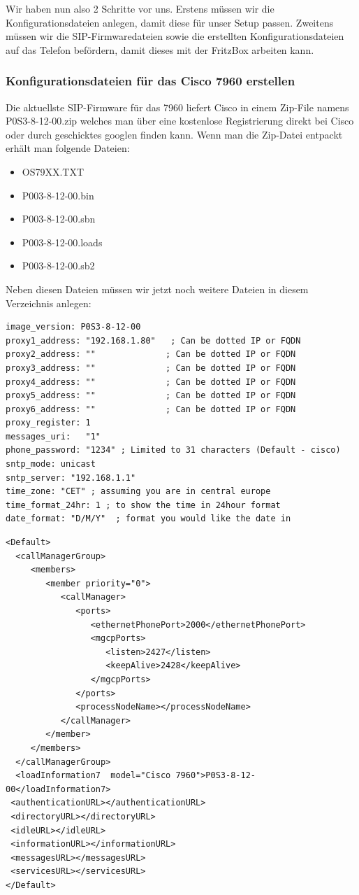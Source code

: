 \documentclass[a4paper,12pt]{scrbook}
\begin{document}
Wir haben nun also 2 Schritte vor uns. Erstens müssen wir die Konfigurationsdateien anlegen, damit diese für unser Setup passen. Zweitens müssen wir die SIP-Firmwaredateien sowie die erstellten Konfigurationsdateien 
auf das Telefon befördern, damit dieses mit der FritzBox arbeiten kann.

\subsubsection{Konfigurationsdateien für das Cisco 7960 erstellen}

Die aktuellste SIP-Firmware für das 7960 liefert Cisco in einem Zip-File namens P0S3-8-12-00.zip welches man über eine kostenlose Registrierung
direkt bei Cisco oder durch geschicktes googlen finden kann. Wenn man die Zip-Datei entpackt erhält man folgende Dateien:
\begin{itemize}
 \item OS79XX.TXT
 \item P003-8-12-00.bin
 \item P003-8-12-00.sbn
 \item P003-8-12-00.loads
 \item P003-8-12-00.sb2
\end{itemize}

Neben diesen Dateien müssen wir jetzt noch weitere Dateien in diesem Verzeichnis anlegen:

\begin{lstlisting}[caption={SIPDefault.cnf},label=lst:7960sipdefaultcnf]
image_version: P0S3-8-12-00
proxy1_address: "192.168.1.80"   ; Can be dotted IP or FQDN
proxy2_address: ""              ; Can be dotted IP or FQDN
proxy3_address: ""              ; Can be dotted IP or FQDN
proxy4_address: ""              ; Can be dotted IP or FQDN
proxy5_address: ""              ; Can be dotted IP or FQDN
proxy6_address: ""              ; Can be dotted IP or FQDN
proxy_register: 1
messages_uri:   "1"
phone_password: "1234" ; Limited to 31 characters (Default - cisco)
sntp_mode: unicast
sntp_server: "192.168.1.1" 
time_zone: "CET" ; assuming you are in central europe
time_format_24hr: 1 ; to show the time in 24hour format
date_format: "D/M/Y"  ; format you would like the date in
\end{lstlisting}

\begin{lstlisting}[caption={XMLDefault.cnf.xml},label=lst:7960sipdefaultcnf]
<Default>
  <callManagerGroup>
     <members>
        <member priority="0">
           <callManager>
              <ports>
                 <ethernetPhonePort>2000</ethernetPhonePort>
                 <mgcpPorts>
                    <listen>2427</listen>
                    <keepAlive>2428</keepAlive>
                 </mgcpPorts>
              </ports>
              <processNodeName></processNodeName>
           </callManager>
        </member>
     </members>
  </callManagerGroup>
  <loadInformation7  model="Cisco 7960">P0S3-8-12-00</loadInformation7>
 <authenticationURL></authenticationURL>
 <directoryURL></directoryURL>
 <idleURL></idleURL>
 <informationURL></informationURL>
 <messagesURL></messagesURL>
 <servicesURL></servicesURL>
</Default>
\end{lstlisting}
\end{document}
